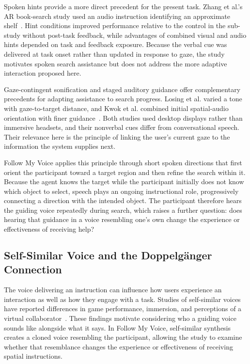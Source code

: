 Spoken hints provide a more direct precedent for the present task. Zhang et al.'s AR book-search study used an audio instruction identifying an approximate shelf~\cite{zhang2023seehear}. Hint conditions improved performance relative to the control in the sub-study without post-task feedback, while advantages of combined visual and audio hints depended on task and feedback exposure. Because the verbal cue was delivered at task onset rather than updated in response to gaze, the study motivates spoken search assistance but does not address the more adaptive interaction proposed here.

Gaze-contingent sonification and staged auditory guidance offer complementary precedents for adapting assistance to search progress. Losing et al. varied a tone with gaze-to-target distance, and Kwok et al. combined initial spatial-audio orientation with finer guidance~\cite{losing2014guiding,kwok2022twostep}. Both studies used desktop displays rather than immersive headsets, and their nonverbal cues differ from conversational speech. Their relevance here is the principle of linking the user's current gaze to the information the system supplies next.

Follow My Voice applies this principle through short spoken directions that first orient the participant toward a target region and then refine the search within it. Because the agent knows the target while the participant initially does not know which object to select, speech plays an ongoing instructional role, progressively connecting a direction with the intended object. The participant therefore hears the guiding voice repeatedly during search, which raises a further question: does hearing that guidance in a voice resembling one's own change the experience or effectiveness of receiving help?

\subsection{Self-Similar Voice and the Doppelgänger Connection}
The voice delivering an instruction can influence how users experience an interaction as well as how they engage with a task. Studies of self-similar voices have reported differences in game performance, immersion, and perceptions of a virtual collaborator~\cite{kao2021selfsimilar,guo2024doppelganger}. These findings motivate considering who a guiding voice sounds like alongside what it says. In Follow My Voice, self-similar synthesis creates a cloned voice resembling the participant, allowing the study to examine whether that resemblance changes the experience or effectiveness of receiving spatial instructions.

